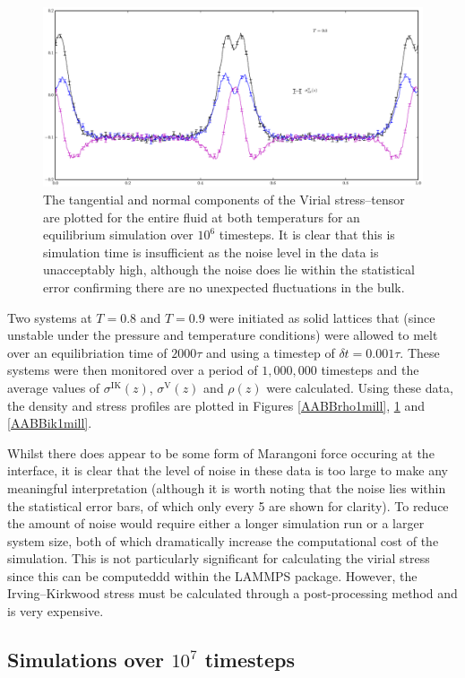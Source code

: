\begin{figure}[h]
\includegraphics{AABBvir1mill}
\caption{The tangential and normal components of the Virial stress--tensor are plotted for the entire fluid at both temperaturs for an equilibrium simulation over $10^{6}$ timesteps.
It is clear that this is simulation time is insufficient as the noise level in the data is unacceptably high, although the noise does lie within the statistical error confirming there are no unexpected fluctuations in the bulk.}
\label{AABBvir1mill}
\end{figure}
Two systems at $T=0.8$ and $T=0.9$ were initiated as solid lattices that (since unstable under the pressure and temperature conditions) were allowed to melt over an equilibriation time of $2000 \tau$ and using a timestep of $\delta t = 0.001\tau$. 
These systems were then monitored over a period of $1,000,000$ timesteps and the average values of $\sigma^{\mathrm{IK}}(z)$, $\sigma^{\mathrm{V}}(z)$ and $\rho(z)$ were calculated.
Using these data, the density and stress profiles are plotted in Figures \ref{AABBrho1mill}, \ref{AABBvir1mill} and \ref{AABBik1mill}.

Whilst there does appear to be some form of Marangoni force occuring at the interface, it is clear that the level of noise in these data is too large to make any meaningful interpretation (although it is worth noting that the noise lies within the statistical error bars, of which only every 5 are shown for clarity). 
To reduce the amount of noise would require either a longer simulation run or a larger system size, both of which dramatically increase the computational cost of the simulation.
This is not particularly significant for calculating the virial stress since this can be computeddd within the LAMMPS package. 
However, the Irving--Kirkwood stress must be calculated through a post-processing method and is very expensive.

\FloatBarrier
\subsection{Simulations over $10^{7}$ timesteps}

